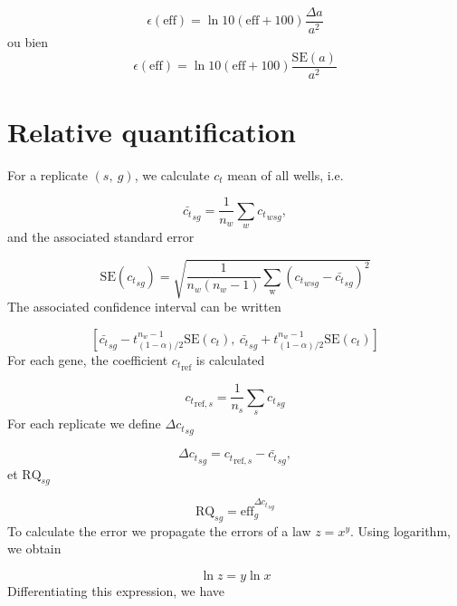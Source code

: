 \documentclass[a4paper,10pt]{article}
\begin{document}
\begin{equation}
 \epsilon(\text{eff}) = \ln 10(\text{eff}+100) \dfrac{\Delta a}{a^2}
\end{equation}
{\color{red} ou bien} 
\begin{equation}
 \epsilon(\text{eff}) = \ln 10(\text{eff}+100) \dfrac{\text{SE}(a)}{a^2}
\end{equation}


\section{Relative quantification}

For a replicate $(s,\ g)$, we calculate $c_t$ mean of all wells, i.e.

\begin{equation}
 {\bar{c_t}}_{sg} = \dfrac{1}{n_w}\sum_{w}{c_t}_{wsg},
\end{equation}
and the associated standard error

\begin{equation}
 \text{SE} ({c_t}_{sg}) =
\sqrt{\dfrac{1}{n_w(n_w-1)}\sum_{\text{w}}
({c_t}_{wsg}-{\bar{c_t}}_{sg})^2}
\end{equation}
The associated confidence interval can be written 

\begin{equation}
 \left[{\bar{c_t}}_{sg}-t_{(1-\alpha)/2}^{n_w-1}\text{SE}(c_t),\
{\bar{c_t}}_{sg}+t_{(1-\alpha)/2}^{n_w-1}\text{SE}(c_t)\right]
\end{equation}
For each gene, the coefficient ${c_t}_{\text{ref}}$ is calculated

\begin{equation}
 {c_t}_{\text{ref},s} = \dfrac{1}{n_s}\sum_{s}{c_t}_{sg} 
\end{equation}
For each replicate we define ${\Delta c_t}_{sg}$

\begin{equation}
 {\Delta c_t}_{sg} = {c_t}_{\text{ref},s} - {\bar{c_t}}_{sg},
\end{equation}
et $\text{RQ}_{sg}$

\begin{equation}
 \text{RQ}_{sg} = \text{eff}_g^{{\Delta c_t}_{sg}}
\end{equation}
To calculate the error we propagate the errors of a law $z=x^y$. Using logarithm, we obtain

\begin{equation}
 \ln z = y\ln x
\end{equation}
Differentiating this expression, we have
\end{document}
